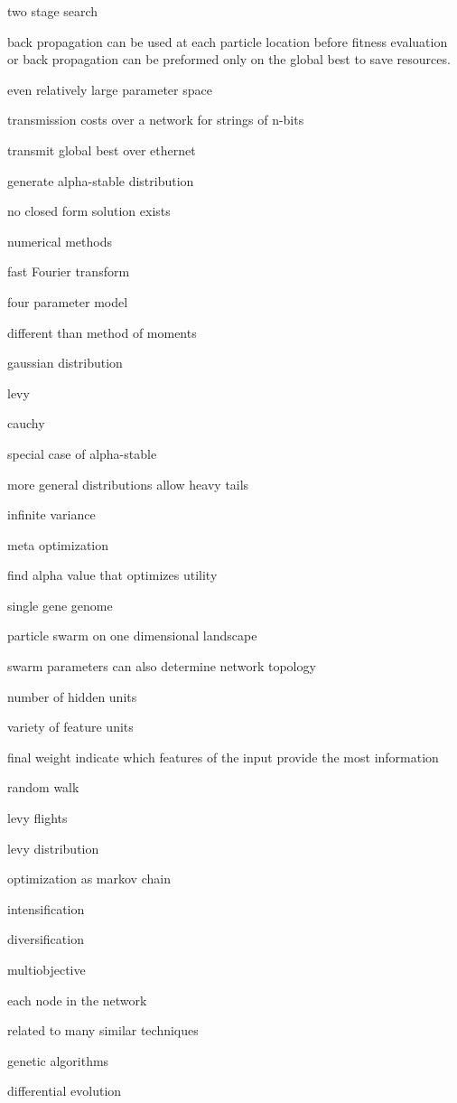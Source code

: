 \documentclass[8pt,journal,compsoc]{IEEEtran}
\begin{document}
two stage search 

back propagation can be used at each particle location before fitness evaluation or back propagation can be preformed only on the global best to save resources.

even relatively large parameter space

transmission costs over a network for strings of n-bits

transmit global best over ethernet 

generate alpha-stable distribution 

no closed form solution exists 

numerical methods 

fast Fourier transform 

four parameter model 

different than method of moments  

gaussian distribution 

levy 

cauchy

special case of alpha-stable 

more general distributions allow heavy tails 

infinite variance  

meta optimization 

find alpha value that optimizes utility 

single gene genome 

particle swarm on one dimensional landscape 

swarm parameters can also determine network topology 

number of hidden units 

variety of feature units 

final weight indicate which features of the input provide the most information 

random walk 

levy flights 

levy distribution 

optimization as markov chain 

intensification 

diversification 

multiobjective

each node in the network 

related to many similar techniques 

genetic algorithms 

differential evolution
\end{document}
